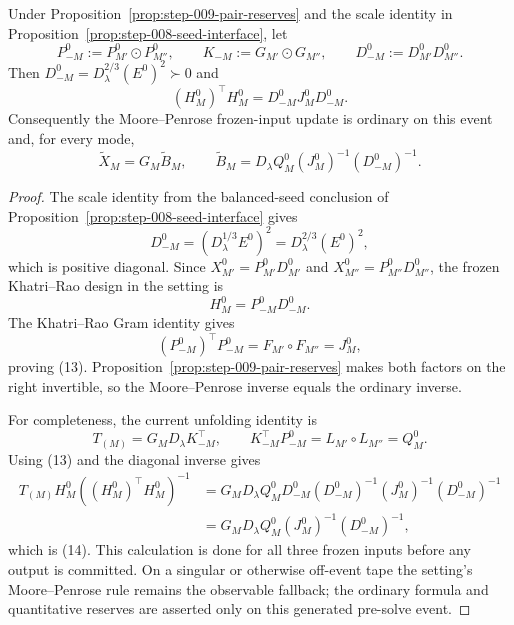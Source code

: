 \begin{lemma}\label{lem:step-009-congruence}
Under Proposition~\ref{prop:step-009-pair-reserves} and the scale identity
in Proposition~\ref{prop:step-008-seed-interface}, let
\[
P_{-M}^0:=P_{M'}^0\odot P_{M''}^0,\qquad
K_{-M}:=G_{M'}\odot G_{M''},\qquad
D_{-M}^0:=D_{M'}^0D_{M''}^0.
\]
Then \(D_{-M}^0=D_\lambda^{2/3}(E^0)^2\succ0\) and
\[
(H_M^0)^\top H_M^0=D_{-M}^0J_M^0D_{-M}^0. \tag{13}
\]
Consequently the Moore--Penrose frozen-input update is ordinary on this
event and, for every mode,
\[
\widetilde X_M=G_M\widetilde B_M,\qquad
\widetilde B_M=D_\lambda Q_M^0(J_M^0)^{-1}(D_{-M}^0)^{-1}. \tag{14}
\]

\begin{proof}

The scale identity from the balanced-seed conclusion of Proposition~\ref{prop:step-008-seed-interface} gives
\[
D_{-M}^0=(D_\lambda^{1/3}E^0)^2
=D_\lambda^{2/3}(E^0)^2,
\]
which is positive diagonal. Since
\(X_{M'}^0=P_{M'}^0D_{M'}^0\) and
\(X_{M''}^0=P_{M''}^0D_{M''}^0\), the frozen Khatri--Rao design in the
setting is
\[
H_M^0=P_{-M}^0D_{-M}^0.
\]
The Khatri--Rao Gram identity gives
\[
(P_{-M}^0)^\top P_{-M}^0
=F_{M'}\circ F_{M''}=J_M^0,
\]
proving (13). Proposition~\ref{prop:step-009-pair-reserves} makes both
factors on the right invertible, so the Moore--Penrose inverse equals the
ordinary inverse.

For completeness, the current unfolding identity is
\[
T_{(M)}=G_MD_\lambda K_{-M}^\top,\qquad
K_{-M}^\top P_{-M}^0=L_{M'}\circ L_{M''}=Q_M^0. \tag{15}
\]
Using (13) and the diagonal inverse gives
\[
\begin{aligned}
T_{(M)}H_M^0((H_M^0)^\top H_M^0)^{-1}
 &=G_MD_\lambda Q_M^0D_{-M}^0
   (D_{-M}^0)^{-1}(J_M^0)^{-1}(D_{-M}^0)^{-1}\\
 &=G_MD_\lambda Q_M^0(J_M^0)^{-1}(D_{-M}^0)^{-1},
\end{aligned}
\]
which is (14). This calculation is done for all three frozen inputs before
any output is committed. On a singular or otherwise off-event tape the
setting's Moore--Penrose rule remains the observable fallback; the ordinary
formula and quantitative reserves are asserted only on this generated
pre-solve event. 


\end{proof}
\end{lemma}

